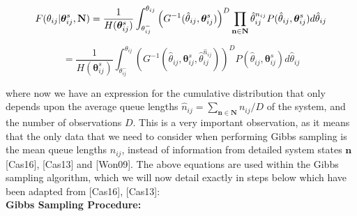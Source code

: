 \documentclass[a4paper,11pt,titlepage]{article}
\begin{document}
\begin{equation}
    F(\theta_{ij}|\bm{\theta}_{ij}^{s}, \mathbf{N}) = \frac{1}{H(\bm{\theta}_{ij}^{s})} \int_{\theta_{ij}^{-}}^{\theta_{ij}}\left( G^{-1} (\hat{\theta}_{ij}, \bm{\theta}_{ij}^{s}) \right)^D \prod_{\mathbf{n} \in \mathbf{N}} \hat{\theta}_{ij}^{n_{ij}} P(\hat{\theta}_{ij}, \bm{\theta}_{ij}^{s}) d \hat{\theta}_{ij} \\
    \label{eqn:final_dist_gibbs}
\end{equation}

$$ = \frac{1}{H(\bm{\theta}_{ij}^{s})} \int_{\theta_{ij}^{-}}^{\theta_{ij}}\left( G^{-1} (\hat{\theta}_{ij}, \bm{\theta}_{ij}^{s},\hat{\theta}_{ij}^{\hat{n}_{ij}}) \right)^D P(\hat{\theta}_{ij}, \bm{\theta}_{ij}^{s}) d \hat{\theta}_{ij}$$

where now we have an expression for the cumulative distribution that only depends upon the average queue lengths $\hat{n}_{ij} = \sum_{\mathbf{n} \in \mathbf{N}} n_{ij}/D$ of the system, and the number of observations $D$. This is a very important observation, as it means that the only data that we need to consider when performing Gibbs sampling is the mean queue lengths $\hat{n}_{ij}$, instead of information from detailed system states $\mathbf{n}$ [Cas16], [Cas13] and [Won09]. The above equations are used within the Gibbs sampling algorithm, which we will now detail exactly in steps below which have been adapted from [Cas16], [Cas13]:  \\

\textbf{Gibbs Sampling Procedure:}
\end{document}
